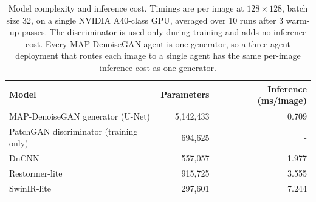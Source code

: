 \begin{table}[!t]
\centering
\caption{Model complexity and inference cost. Timings are per image at $128\times128$, batch size 32, on a single NVIDIA A40-class GPU, averaged over 10 runs after 3 warm-up passes. The discriminator is used only during training and adds no inference cost. Every MAP-DenoiseGAN agent is one generator, so a three-agent deployment that routes each image to a single agent has the same per-image inference cost as one generator.}
\label{tab:complexity}
\begin{tabular}{lrr}
\toprule
Model & Parameters & Inference (ms/image) \\
\midrule
MAP-DenoiseGAN generator (U-Net) & 5,142,433 & 0.709 \\
PatchGAN discriminator (training only) & 694,625 & - \\
DnCNN & 557,057 & 1.977 \\
Restormer-lite & 915,725 & 3.555 \\
SwinIR-lite & 297,601 & 7.244 \\
\bottomrule
\end{tabular}
\end{table}
